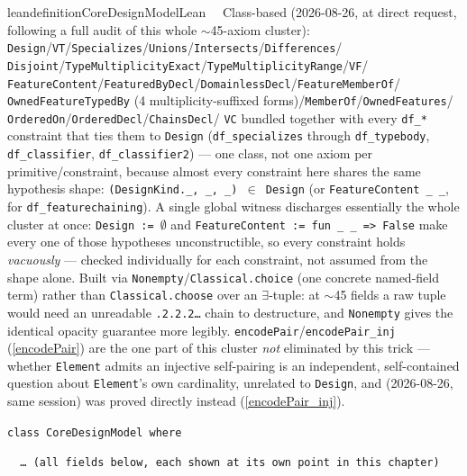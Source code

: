 \begin{restatable}{leandefinition}{CoreDesignModelLean}~~ Class-based
(2026-08-26, at direct request, following a full audit of this whole $\sim$45-axiom cluster):
\texttt{Design}/\texttt{VT}/\texttt{Specializes}/\texttt{Unions}/\texttt{Intersects}/\texttt{Differences}/
\texttt{Disjoint}/\texttt{TypeMultiplicityExact}/\texttt{TypeMultiplicityRange}/\texttt{VF}/
\texttt{FeatureContent}/\texttt{FeaturedByDecl}/\texttt{DomainlessDecl}/\texttt{FeatureMemberOf}/
\texttt{OwnedFeatureTypedBy} (4 multiplicity-suffixed forms)/\texttt{MemberOf}/\texttt{OwnedFeatures}/
\texttt{OrderedOn}/\texttt{OrderedDecl}/\texttt{ChainsDecl}/
\texttt{VC} bundled together with every \texttt{df\_*} constraint that ties them to \texttt{Design}
(\texttt{df\_specializes} through \texttt{df\_typebody}, \texttt{df\_classifier},
\texttt{df\_classifier2}) --- one class, not one axiom per primitive/constraint, because almost every
constraint here shares the same hypothesis shape: \texttt{(DesignKind.\_, \_, \_) $\in$ Design} (or
\texttt{FeatureContent \_ \_}, for \texttt{df\_featurechaining}). A single global witness discharges
essentially the whole cluster at once: \texttt{Design := $\emptyset$} and \texttt{FeatureContent := fun
\_ \_ => False} make every one of those hypotheses unconstructible, so every constraint holds
\emph{vacuously} --- checked individually for each constraint, not assumed from the shape alone.
Built via \texttt{Nonempty}/\texttt{Classical.choice} (one concrete named-field term) rather than
\texttt{Classical.choose} over an $\exists$-tuple: at $\sim$45 fields a raw tuple would need an
unreadable \texttt{.2.2.2\ldots} chain to destructure, and \texttt{Nonempty} gives the identical
opacity guarantee more legibly. \texttt{encodePair}/\texttt{encodePair\_inj} (\ref{encodePair}) are the
one part of this cluster \emph{not} eliminated by this trick --- whether \texttt{Element} admits an
injective self-pairing is an independent, self-contained question about \texttt{Element}'s own
cardinality, unrelated to \texttt{Design}, and (2026-08-26, same session) was proved directly instead
(\ref{encodePair_inj}).

\texttt{\textcolor{leancolor}{class} \textcolor{leanyellow}{CoreDesignModel} \textcolor{leancolor}{where}}

\texttt{~~\ldots\ (all fields below, each shown at its own point in this chapter)}
\label{CoreDesignModel}
\end{restatable}

